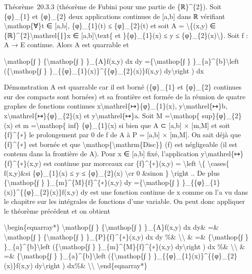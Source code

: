 \documentclass[]{article}
\begin{document}
Théorème~20.3.3 (théorème de Fubini pour une partie de \{ℝ\}\^{}\{2\}).
Soit \{φ\}\_\{1\} et \{φ\}\_\{2\} deux applications continues de
{[}a,b{]} dans ℝ vérifiant \textbackslash{}mathop\{∀\}t ∈ {[}a,b{]},
\{φ\}\_\{1\}(t) ≤ \{φ\}\_\{2\}(t) et soit A = \textbackslash{}\{(x,y) ∈
\{ℝ\}\^{}\{2\}\textbackslash{}mathrel\{∣\}x ∈
{[}a,b{]}\textbackslash{}text\{ et \}\{φ\}\_\{1\}(x) ≤ y ≤
\{φ\}\_\{2\}(x)\textbackslash{}\}. Soit f : A → E continue. Alors A est
quarrable et

\textbackslash{}mathop\{∫ \} \{\textbackslash{}mathop\{∫ \}
\}\_\{A\}f(x,y) dx dy =\{\textbackslash{}mathop\{∫ \}
\}\_\{a\}\^{}\{b\}\textbackslash{}left (\{\textbackslash{}mathop\{∫ \}
\}\_\{\{φ\}\_\{1\}(x)\}\^{}\{\{φ\}\_\{2\}(x)\}f(x,y)
dy\textbackslash{}right ) dx

Démonstration A est quarrable car il est borné (\{φ\}\_\{1\} et
\{φ\}\_\{2\} continues sur des compacts sont bornées) et sa frontière
est formée de la réunion de quatre graphes de fonctions continues
x\textbackslash{}mathrel\{↦\}\{φ\}\_\{1\}(x),
y\textbackslash{}mathrel\{↦\}b,
x\textbackslash{}mathrel\{↦\}\{φ\}\_\{2\}(x) et
y\textbackslash{}mathrel\{↦\}a. Soit M =\textbackslash{}mathop\{
sup\}\{φ\}\_\{2\}(x) et m =\textbackslash{}mathop\{ inf\}
\{φ\}\_\{1\}(x) si bien que A ⊂ {[}a,b{]} × {[}m,M{]} et soit
\{f\}\^{}\{∗\} le prolongement par 0 de f de A à P = {[}a,b{]} ×
{[}m,M{]}. On sait déjà que \{f\}\^{}\{∗\} est bornée et que
\textbackslash{}mathop\{\textbackslash{}mathrm\{Disc\}\} (f) est
négligeable (il est contenu dans la frontière de A). Pour x ∈ {[}a,b{]}
fixé, l'application y\textbackslash{}mathrel\{↦\}\{f\}\^{}\{∗\}(x,y) est
continue par morceaux car \{f\}\^{}\{∗\}(x,y) = \textbackslash{}left
\textbackslash{}\{ \textbackslash{}cases\{ f(x,y)\&si \{φ\}\_\{1\}(x) ≤
y ≤ \{φ\}\_\{2\}(x) \textbackslash{}cr 0 \&sinon \}
\textbackslash{}right .. De plus \{\textbackslash{}mathop\{∫ \}
\}\_\{m\}\^{}\{M\}\{f\}\^{}\{∗\}(x,y) dy =\{\textbackslash{}mathop\{∫ \}
\}\_\{\{φ\}\_\{1\}(x)\}\^{}\{\{φ\}\_\{2\}(x)\}f(x,y) dy est une fonction
continue de x comme on l'a vu dans le chapitre sur les intégrales de
fonctions d'une variable. On peut donc appliquer le théorème précédent
et on obtient

\textbackslash{}begin\{eqnarray*\} \textbackslash{}mathop\{∫ \}
\{\textbackslash{}mathop\{∫ \} \}\_\{A\}f(x,y) dx dy\& =\&
\textbackslash{}mathop\{∫ \} \{\textbackslash{}mathop\{∫ \}
\}\_\{P\}\{f\}\^{}\{∗\}(x,y) dx dy \%\& \textbackslash{}\textbackslash{}
\& =\& \{\textbackslash{}mathop\{∫ \}
\}\_\{a\}\^{}\{b\}\textbackslash{}left (\{\textbackslash{}mathop\{∫ \}
\}\_\{m\}\^{}\{M\}\{f\}\^{}\{∗\}(x,y) dy\textbackslash{}right ) dx \%\&
\textbackslash{}\textbackslash{} \& =\& \{\textbackslash{}mathop\{∫ \}
\}\_\{a\}\^{}\{b\}\textbackslash{}left (\{\textbackslash{}mathop\{∫ \}
\}\_\{\{φ\}\_\{1\}(x)\}\^{}\{\{φ\}\_\{2\}(x)\}f(x,y)
dy\textbackslash{}right ) dx\%\& \textbackslash{}\textbackslash{}
\textbackslash{}end\{eqnarray*\}
\end{document}
